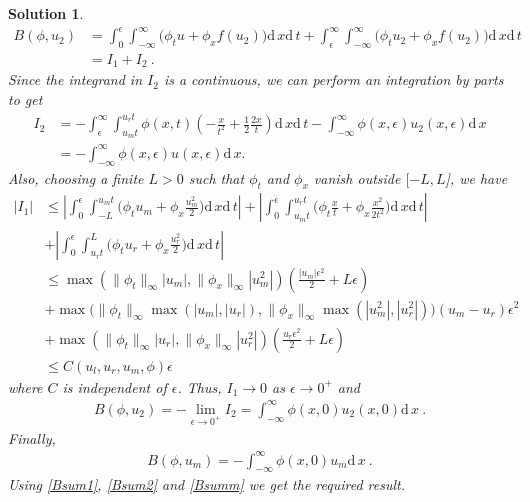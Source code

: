\documentclass[10pt,letterpaper]{article}
\newcommand{\dif}[1][]{\mathrm{d} {#1}\,}
\newcommand{\frb}[1]{ \left(  {#1} \right) }
\theoremstyle{break}
\newtheorem{mysolution}{Solution}
\newenvironment{solution}{\begin{mysolution}}{\end{mysolution}}
\begin{document}
\begin{solution}
	\begin{align}
	B\frb{\phi,u_2} &=  \int_0^\epsilon \int_{-\infty}^\infty \Big(\phi_t u +\phi_x f\frb{u_2}\Big)\dif x\dif t +  \int_\epsilon^\infty \int_{-\infty}^\infty \Big(\phi_t u_2 +\phi_x f\frb{u_2}\Big)\dif x\dif t \\
	 & = I_1 + I_2 \ .
	\end{align}
	Since the integrand in $I_2$ is a continuous, we can perform an integration by parts to get
	\begin{align}
	I_2 &= - \int_\epsilon^\infty \int_{u_m t}^{u_r t} \phi(x,t) \left( - \frac{x}{t^2} + \frac{1}{2} \frac{2 x}{t} \right) \dif x \dif t - \int_{-\infty}^\infty \phi(x,\epsilon) u_2(x,\epsilon) \dif x  \\
		& = - \int_{-\infty}^\infty \phi(x,\epsilon) u(x,\epsilon) \dif x.
	\end{align}
	Also, choosing a finite $L>0$ such that $\phi_t$ and $\phi_x$ vanish outside $[-L,L$], we have
	\begin{align}
	|I_1| &\leq \left| \int_0^\epsilon \int_{-L}^{u_mt} \Big(\phi_t u_m +\phi_x \frac{u_m^2}{2}\Big)\dif x\dif t \right| + \left| \int_0^\epsilon \int_{u_mt}^{u_rt} \Big(\phi_t \frac{x}{t} +\phi_x \frac{x^2}{2t^2}\Big)\dif x\dif t \right|  \\
	&+ \left| \int_0^\epsilon \int_{u_rt}^L \Big(\phi_t u_r +\phi_x \frac{u_r^2}{2}\Big)\dif x\dif t \right| \\
	&\leq \max{(\|\phi_t\|_\infty|u_m|,\|\phi_x\|_\infty|u_m^2|)} \left( \frac{|u_m| \epsilon^2}{2} + L \epsilon \right) \\
	& + \max{\big(\|\phi_t\|_\infty \max(|u_m|,|u_r|),\|\phi_x\|_\infty \max(|u_m^2|,|u_r^2|)\big)} (u_m - u_r) \epsilon^2 \\
	& + \max{(\|\phi_t\|_\infty|u_r|,\|\phi_x\|_\infty|u_r^2|)} \left( \frac{u_r \epsilon^2}{2} + L \epsilon \right) \\
	& \leq C(u_l,u_r, u_m, \phi) \epsilon
	\end{align}
	where $C$ is independent of $\epsilon$. Thus, $I_1 \rightarrow 0$ as $\epsilon \rightarrow 0^+$ and
	\begin{gather} \label{Bsum2}
		B\frb{\phi,u_2}= - \lim \limits_{\epsilon \rightarrow 0^+} I_2 = \int_{-\infty}^{\infty} \phi(x,0) u_2(x,0) \dif x\ .
	\end{gather}
	Finally, 
	\begin{gather} \label{Bsumm}
		B\frb{\phi,u_m}= - \int_{-\infty}^{\infty} \phi(x,0) u_m \dif x\ .
	\end{gather}
	Using \eqref{Bsum1}, \eqref{Bsum2} and \eqref{Bsumm} we get the required result.
\end{solution}
\end{document}
